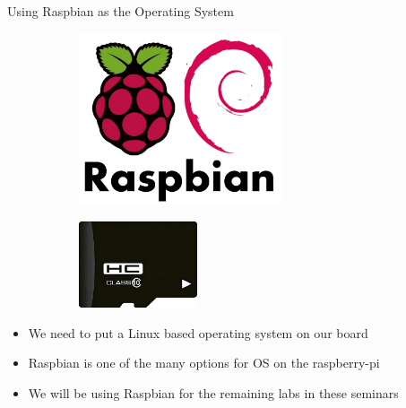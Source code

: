 \begin{frame}
   {Using Raspbian as the Operating System}
   \begin{figure}[H]
      \centering
      \begin{subfigure}{0.4\textwidth}
         \centering
         \includegraphics[height=2in]{IMAGES/raspbian-logo}
      \end{subfigure}
      \begin{subfigure}{0.4\textwidth}
         \centering
         \includegraphics[height=1in]{IMAGES/uSD-card}
      \end{subfigure}
   \end{figure}
   \begin{itemize}
      \item We need to put a Linux based operating system on our board
      \item Raspbian is one of the many options for OS on the raspberry-pi
      \item We will be using Raspbian for the remaining labs in these seminars
   \end{itemize}
\end{frame}

\cprotect{}

